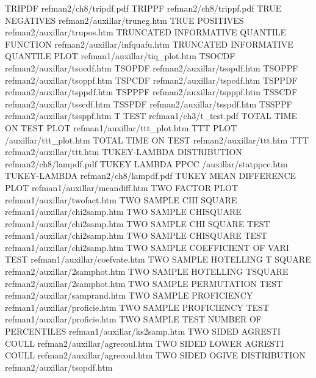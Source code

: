TRIPDF                                  refman2/ch8/tripdf.pdf
TRIPPF                                  refman2/ch8/trippf.pdf
TRUE NEGATIVES                          refman2/auxillar/truneg.htm
TRUE POSITIVES                          refman2/auxillar/trupos.htm
TRUNCATED INFORMATIVE QUANTILE FUNCTION refman2/auxillar/infquafu.htm
TRUNCATED INFORMATIVE QUANTILE PLOT     refman1/auxillar/tiq_plot.htm
TSOCDF                                  refman2/auxillar/tsocdf.htm
TSOPDF                                  refman2/auxillar/tsopdf.htm
TSOPPF                                  refman2/auxillar/tsoppf.htm
TSPCDF                                  refman2/auxillar/tspcdf.htm
TSPPDF                                  refman2/auxillar/tsppdf.htm
TSPPPF                                  refman2/auxillar/tspppf.htm
TSSCDF                                  refman2/auxillar/tsscdf.htm
TSSPDF                                  refman2/auxillar/tsspdf.htm
TSSPPF                                  refman2/auxillar/tssppf.htm
T TEST                                  refman1/ch3/t_test.pdf
TOTAL TIME ON TEST PLOT                 refman1/auxillar/ttt_plot.htm
TTT PLOT                                /auxillar/ttt_plot.htm
TOTAL TIME ON TEST                      refman2/auxillar/ttt.htm
TTT                                     refman2/auxillar/ttt.htm
TUKEY-LAMBDA DISTRIBUTION               refman2/ch8/lampdf.pdf
TUKEY LAMBDA PPCC                       /auxillar/statppcc.htm
TUKEY-LAMBDA                            refman2/ch8/lampdf.pdf
TUKEY MEAN DIFFERENCE PLOT              refman1/auxillar/meandiff.htm
TWO FACTOR PLOT                         refman1/auxillar/twofact.htm
TWO SAMPLE CHI SQUARE                   refman1/auxillar/chi2samp.htm
TWO SAMPLE CHISQUARE                    refman1/auxillar/chi2samp.htm
TWO SAMPLE CHI SQUARE TEST              refman1/auxillar/chi2samp.htm
TWO SAMPLE CHISQUARE TEST               refman1/auxillar/chi2samp.htm
TWO SAMPLE COEFFICIENT OF VARI TEST     refman1/auxillar/coefvate.htm
TWO SAMPLE HOTELLING T SQUARE           refman2/auxillar/2samphot.htm
TWO SAMPLE HOTELLING TSQUARE            refman2/auxillar/2samphot.htm
TWO SAMPLE PERMUTATION TEST             refman2/auxillar/samprand.htm
TWO SAMPLE PROFICIENCY                  refman1/auxillar/proficie.htm
TWO SAMPLE PROFICIENCY TEST             refman1/auxillar/proficie.htm
TWO SAMPLE TEST NUMBER OF PERCENTILES   refman1/auxillar/ks2samp.htm
TWO SIDED AGRESTI COULL                 refman2/auxillar/agrecoul.htm
TWO SIDED LOWER AGRESTI COULL           refman2/auxillar/agrecoul.htm
TWO SIDED OGIVE DISTRIBUTION            refman2/auxillar/tsopdf.htm
